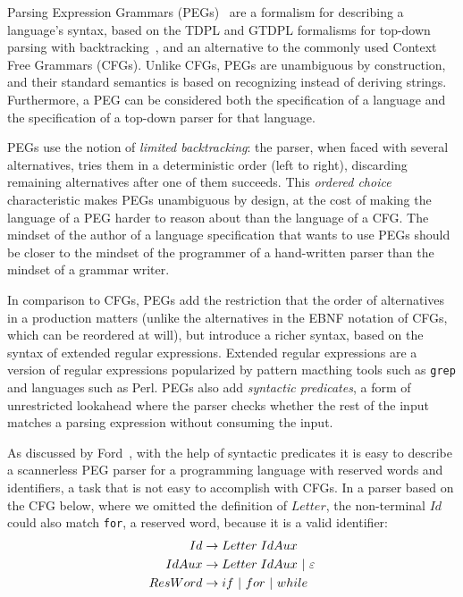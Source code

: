 Parsing Expression Grammars (PEGs)~\cite{ford:peg} are a formalism for
describing a language's syntax, based on the TDPL and GTDPL formalisms
for top-down parsing with backtracking~\cite{birman:tdpl,aho:parsing}, 
and an alternative to the commonly used Context Free Grammars (CFGs). 
Unlike CFGs, PEGs are unambiguous
by construction, and their standard semantics is based on recognizing
instead of deriving strings. Furthermore, a PEG can be considered both the
specification of a language and the specification of a top-down parser
for that language. 

PEGs use the notion of {\em limited backtracking}: the parser, when faced with several
alternatives, tries them in a deterministic order (left to right),
discarding remaining alternatives after one of them succeeds.
This {\em ordered choice} characteristic makes PEGs unambiguous by
design, at the cost of making the language of a PEG harder to reason
about than the language of a CFG. The mindset of the author of a language specification
that wants to use PEGs should be closer to the mindset of the programmer of a hand-written
parser than the mindset of a grammar writer.

In comparison to CFGs, PEGs add the restriction that the order of alternatives in
a production matters (unlike the alternatives in the EBNF notation of CFGs, which can be reordered at will), 
but introduce a richer syntax, based on the syntax of extended
regular expressions. Extended regular expressions are a version of regular expressions popularized by pattern macthing
tools such as {\tt grep} and languages such as Perl. PEGs also add {\em syntactic predicates}, a form
of unrestricted lookahead where the parser checks whether the rest of
the input matches a parsing expression without consuming the input.

As discussed by Ford~\cite{ford:thesis}, with the help of syntactic
predicates it is easy to describe a scannerless PEG parser for a programming
language with reserved words and identifiers, a task that is not easy to
accomplish with CFGs. In a parser based on the CFG below, where we omitted
the definition of $Letter$, the non-terminal $I\!d$ could also match {\tt for},
a reserved word, because it is a valid identifier:
\begin{align*}
Id & \rightarrow Letter \; IdAux \\
IdAux & \rightarrow Letter \; IdAux \ | \ \Epsi \\
ResWord & \rightarrow if \ | \ for \ | \ while
\end{align*}

